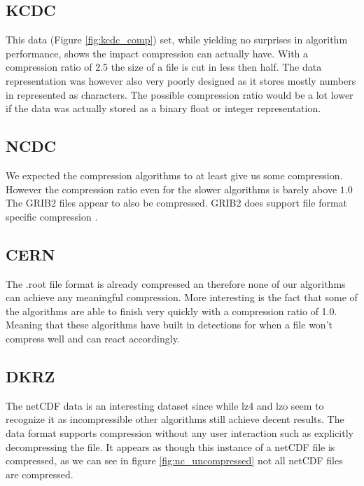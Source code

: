 \documentclass[
	12pt,
	a4paper,
	BCOR10mm,
	DIV14,
	listof=totoc,
	bibliography=totoc,
	headsepline
]{scrreprt}
\begin{document}
\subsection{KCDC}


This data (Figure \ref{fig:kcdc_comp}) set, while yielding no surprises in algorithm performance, shows the impact compression can actually have. With a compression ratio of 2.5 the size of a file is cut in less then half.
The data representation was however also very poorly designed as it stores mostly numbers in represented as characters.
The possible compression ratio would be a lot lower if the data was actually stored as a binary float or integer representation.





\FloatBarrier
\subsection{NCDC}


We expected the compression algorithms to at least give us some compression.
However the compression ratio even for the slower algorithms is barely above $1.0$
The GRIB2 files appear to also be compressed. GRIB2 does support file format specific compression \cite{GRIMP}.





\FloatBarrier 
\subsection{CERN}



The .root file format is already compressed an therefore none of our algorithms can achieve any meaningful compression. More interesting is the fact that some of the algorithms are able to finish very quickly with a compression ratio of 1.0. 
Meaning that these algorithms have built in detections for when a file won't compress well and can react accordingly.
\FloatBarrier




\FloatBarrier
\subsection{DKRZ}


The netCDF data is an interesting dataset since while lz4 and lzo seem to recognize it as incompressible other algorithms still achieve decent results.
The data format supports compression without any user interaction such as explicitly decompressing the file. It appears as though this instance of a netCDF file is compressed, as we can see in figure \ref{fig:nc_uncompressed} not all netCDF files are compressed.
\end{document}
